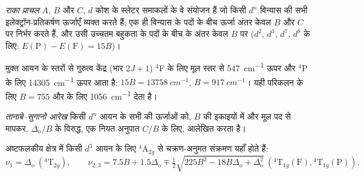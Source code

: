 \begin{definition}[राका प्राचल]\label{def:b3:complex-spectra-magnetism:racah}
\emph{राका प्राचल} $A$, $B$ और $C$, $d$ कोश के स्लेटर समाकलों के
वे संयोजन हैं जो किसी $d^n$ विन्यास की सभी इलेक्ट्रॉन-प्रतिकर्षण
ऊर्जाएँ व्यक्त करते हैं; एक ही विन्यास के पदों के बीच ऊर्जा अंतर
केवल $B$ और $C$ पर निर्भर करते हैं, और उसी
उच्चतम बहुकता के पदों के बीच के अंतर केवल $B$ पर ($d^2$, $d^3$, $d^7$, $d^8$ के लिए: $E(\mathrm P) - E(\mathrm F) = 15B$)।
\end{definition}

\begin{example}[मुक्त-आयन राका प्राचल]\label{ex:b3:complex-spectra-magnetism:free-B}
मुक्त  आयन के स्तरों से गुरुत्व केंद्र (भार $2J + 1$) $^4$F के लिए
मूल स्तर से \qty{547}{cm^{-1}} ऊपर और $^4$P के लिए \qty{14305}{cm^{-1}} ऊपर आता है: $15B = \qty{13758}{cm^{-1}}$,
$B = \qty{917}{cm^{-1}}$। यही परिकलन  के लिए $B = 755$ और
 के लिए \qty{1056}{cm^{-1}} देता है।
\end{example}

\begin{definition}[तानाबे--सुगानो आरेख]\label{def:b3:complex-spectra-magnetism:tanabe-sugano}
\emph{तानाबे--सुगानो आरेख} किसी $d^n$ आयन के सभी
 की ऊर्जाओं को, $B$ की इकाइयों में और
मूल पद से मापकर, $\Delta_{\mathrm o}/B$ के विरुद्ध, एक नियत अनुपात $C/B$ के लिए, आलेखित करता है।
\end{definition}

\begin{proposition}[$d^3$ आयन के तीन बैंड]\label{prop:b3:complex-spectra-magnetism:d3-bands}
अष्टफलकीय क्षेत्र में किसी $d^3$ आयन के लिए $^4$A$_{2g}$ से चक्रण-अनुमत संक्रमण यहाँ होते हैं:
\[
  \nu_1 = \Delta_{\mathrm o}\ (^4\mathrm T_{2g}), \qquad
  \nu_{2,3} = 7.5B + 1.5\Delta_{\mathrm o} \mp \tfrac12\sqrt{225B^2 - 18B\Delta_{\mathrm o} + \Delta_{\mathrm o}^2}\ (^4\mathrm T_{1g}(\mathrm F), {}^4\mathrm T_{1g}(\mathrm P)).
\]
\end{proposition}

